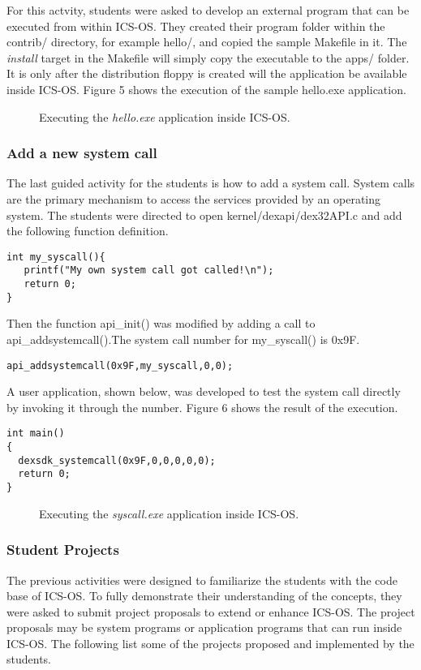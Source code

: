 \documentclass{acm_proc_article-sp}
\begin{document}
For this actvity, students were asked to develop an external program that can 
be executed from within ICS-OS. They created their program folder within
the contrib/ directory, for example hello/, and copied the sample Makefile in 
it. The \textit{install} target in the Makefile will simply copy the 
executable to the apps/ folder. It is only after the distribution floppy
is created will the application be available inside ICS-OS. 
Figure 5 shows the execution of the sample hello.exe application.

\begin{figure}
\centering
{}
\caption{Executing the \textit{hello.exe} application inside ICS-OS.}
\end{figure}
 

\subsubsection{Add a new system call}
The last guided activity for the students is how to add a system call.
System calls are the primary mechanism to access the services provided 
by an operating system. The students were directed to open 
kernel/dexapi/dex32API.c and add the following function definition.

\begin{verbatim}
int my_syscall(){
   printf("My own system call got called!\n");
   return 0;
}
\end{verbatim}

Then the function api\_init() was modified by adding a call to 
api\_addsystemcall().The system call number for my\_syscall() is 0x9F.
\begin{verbatim}
api_addsystemcall(0x9F,my_syscall,0,0);
\end{verbatim}

A user application, shown below, was developed to test the system call directly by invoking
it through the number. Figure 6 shows the result of the execution.

\begin{verbatim}
int main()
{
  dexsdk_systemcall(0x9F,0,0,0,0,0);
  return 0;
}
\end{verbatim}

\begin{figure}
\centering
{}
\caption{Executing the \textit{syscall.exe} application inside ICS-OS.}
\end{figure}

\subsubsection{Student Projects}
The previous activities were designed to familiarize the students with
the code base of ICS-OS. To fully demonstrate their understanding of the 
concepts, they were asked to submit project proposals to extend or enhance
ICS-OS. The project proposals may be system programs or application programs
that can run inside ICS-OS. The following list some of the projects proposed
and implemented by the students.
\end{document}
